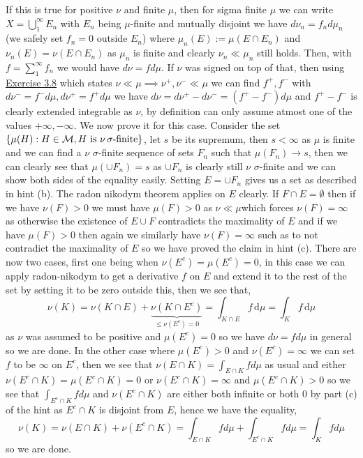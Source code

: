 \documentclass[12pt,a4paper]{article}
\begin{document}
\begin{solution}
If this is true for positive $\nu$ and finite $\mu$, then for sigma finite $\mu$ we can write $X=\bigcup_1^\infty E_n$ with $E_n$ being $\mu$-finite and mutually disjoint we have $d\nu_n=f_nd\mu_n$ (we safely set $f_n=0$ outside $E_n$) where $\mu_n(E):=\mu(E\cap E_n)$ and $\nu_n(E)=\nu(E\cap E_n)$ as $\mu_n$ is finite and clearly $\nu_n\ll\mu_n$ still holds. 
Then, with $f=\sum_1^\infty f_n$ we would have $d\nu=fd\mu$. 
If $\nu$ was signed on top of that, then using \hyperref[prob:3-8]{Exercise 3.8} which states $\nu\ll\mu\implies\nu^+,\nu^-\ll\mu$ we can find $f^+,f^-$ with $d\nu^-=f^-d\mu,d\nu^+=f^+d\mu$ we have $d\nu=d\nu^+-d\nu^-=(f^+-f^-)d\mu$ and $f^+-f^-$ is clearly extended integrable as $\nu$, by definition can only assume atmost one of the values $+\infty,-\infty$. 
We now prove it for this case. 
Consider the set $ \qty{\mu(H):H\in\mathcal{M},H\text{ is }\nu\,\sigma\text{-finite}}$, let $s$ be its supremum, then $s<\infty$ as $\mu$ is finite and we can find a $\nu$ $\sigma$-finite sequence of sets $F_n$ such that $\mu(F_n)\longrightarrow s$, then we can clearly see that $\mu(\cup F_n)=s$ as $\cup F_n$ is clearly still $\nu$ $\sigma$-finite and we can show both sides of the equality easily. 
Setting $E=\cup F_n$ gives us a set as described in hint (b).
The radon nikodym theorem applies on $E$ clearly. 
If $F\cap E=\emptyset$ then if we have $\nu(F)>0$ we must have $\mu(F)>0$ as $\nu\ll\mu$which forces $\nu(F)=\infty$ as otherwise the existence of $E\cup F$ contradicts the maximality of $E$ and if we have $\mu(F)>0$ then again we similarly have $\nu(F)=\infty$ such as to not contradict the maximality of $E$ so we have proved the claim in hint (c). 
There are now two cases, first one being when $\nu(E^c)=\mu(E^c)=0$, in this case we can apply radon-nikodym to get a derivative $f$ on $E$ and extend it to the rest of the set by setting it to be zero outside this, then we see that,
\[
	\nu(K)=\nu(K\cap E)+\underbrace{\nu(K\cap E^c)}_{\leq\nu(E^c)=0}=\int_{K\cap E}f\,\mathrm{d}\mu=\int_K f\,\mathrm{d}\mu
\]
as $\nu$ was assumed to be positive and $\mu(E^c)=0$ so we have $d\nu=fd\mu$ in general so we are done.
In the other case where $\mu(E^c)>0$ and $\nu(E^c)=\infty$ we can set $f$ to be $\infty$ on $E^c$, then we see that $\nu(E\cap K)=\int_{E\cap K}fd\mu$ as usual and either $\nu(E^c\cap K)=\mu(E^c\cap K)=0$ or $\nu(E^c\cap K)=\infty$ and $\mu(E^c\cap K)>0$ so we see that $\int_{E^c\cap K}fd\mu$ and $\nu(E^c\cap K)$ are either both infinite or both $0$ by part (c) of the hint as $E^c\cap K$ is disjoint from $E$, hence we have the equality,
\[
	\nu(K)=\nu(E\cap K)+\nu(E^c\cap K)=\int_{E\cap K}fd\mu+\int_{E^c\cap K}fd\mu=\int_Kfd\mu
\]
so we are done.
\end{solution}
\end{document}
